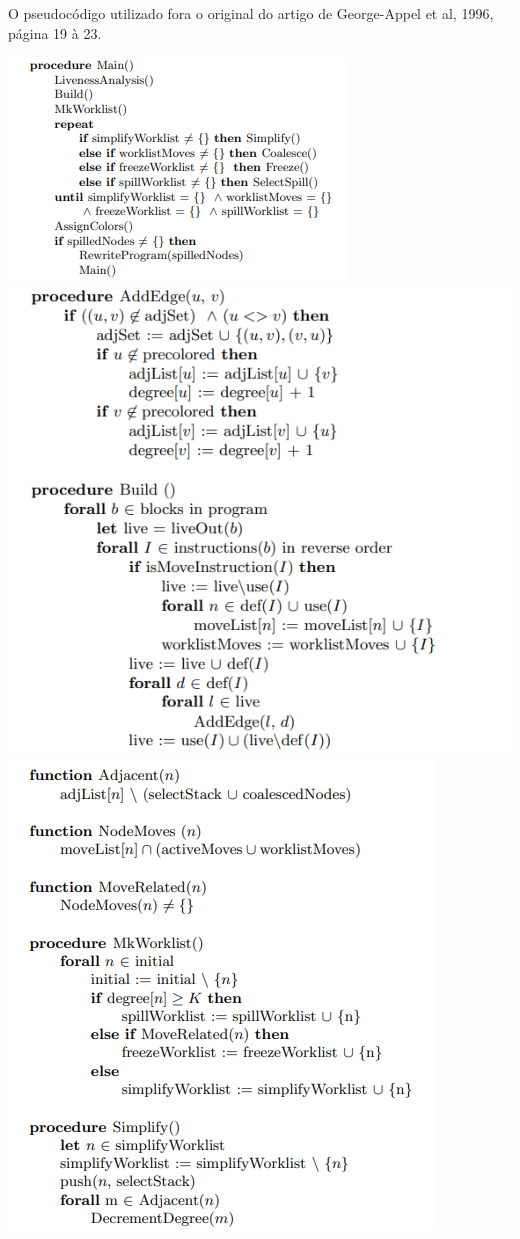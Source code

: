O pseudocódigo utilizado fora o original do artigo de George-Appel et al, 1996, página 19 à 23.

\begin{center}
    \includegraphics[scale=0.6]{img/code1.png}
    \includegraphics[scale=0.6]{img/code2.png}
    \includegraphics[scale=0.6]{img/code3.png}

\end{center}

